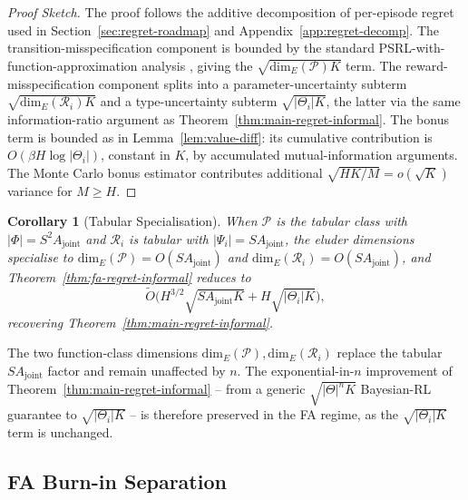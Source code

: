 \documentclass{article}
\newtheorem{corollary}[theorem]{Corollary}
\begin{document}
\begin{proof}[Proof Sketch]
The proof follows the additive decomposition of per-episode regret used in Section~\ref{sec:regret-roadmap} and Appendix~\ref{app:regret-decomp}. The transition-misspecification component is bounded by the standard PSRL-with-function-approximation analysis \citep{osband2014model,russo2014learning}, giving the $\sqrt{\mathrm{dim}_E(\mathcal{P}) K}$ term. The reward-misspecification component splits into a parameter-uncertainty subterm $\sqrt{\mathrm{dim}_E(\mathcal{R}_i) K}$ and a type-uncertainty subterm $\sqrt{|\Theta_i| K}$, the latter via the same information-ratio argument as Theorem~\ref{thm:main-regret-informal}. The bonus term is bounded as in Lemma~\ref{lem:value-diff}: its cumulative contribution is $O(\beta H \log|\Theta_i|)$, constant in $K$, by accumulated mutual-information arguments. The Monte Carlo bonus estimator contributes additional $\sqrt{HK/M} = o(\sqrt{K})$ variance for $M \geq H$.
\end{proof}

\begin{corollary}[Tabular Specialisation]
\label{cor:fa-regret-tabular}
When $\mathcal{P}$ is the tabular class with $|\Phi| = S^2 A_{\mathrm{joint}}$ and $\mathcal{R}_i$ is tabular with $|\Psi_i| = S A_{\mathrm{joint}}$, the eluder dimensions specialise to $\mathrm{dim}_E(\mathcal{P}) = O(S A_{\mathrm{joint}})$ and $\mathrm{dim}_E(\mathcal{R}_i) = O(S A_{\mathrm{joint}})$, and Theorem~\ref{thm:fa-regret-informal} reduces to
\begin{equation}
\tilde O\big(H^{3/2}\sqrt{S A_{\mathrm{joint}} K} + H\sqrt{|\Theta_i| K}\big),
\end{equation}
recovering Theorem~\ref{thm:main-regret-informal}.
\end{corollary}

The two function-class dimensions $\mathrm{dim}_E(\mathcal{P}), \mathrm{dim}_E(\mathcal{R}_i)$ replace the tabular $S A_{\mathrm{joint}}$ factor and remain unaffected by $n$. The exponential-in-$n$ improvement of Theorem~\ref{thm:main-regret-informal} -- from a generic $\sqrt{|\Theta|^n K}$ Bayesian-RL guarantee to $\sqrt{|\Theta_i| K}$ -- is therefore preserved in the FA regime, as the $\sqrt{|\Theta_i| K}$ term is unchanged.

\subsection{FA Burn-in Separation}
\label{app:fa-burnin}
\end{document}
